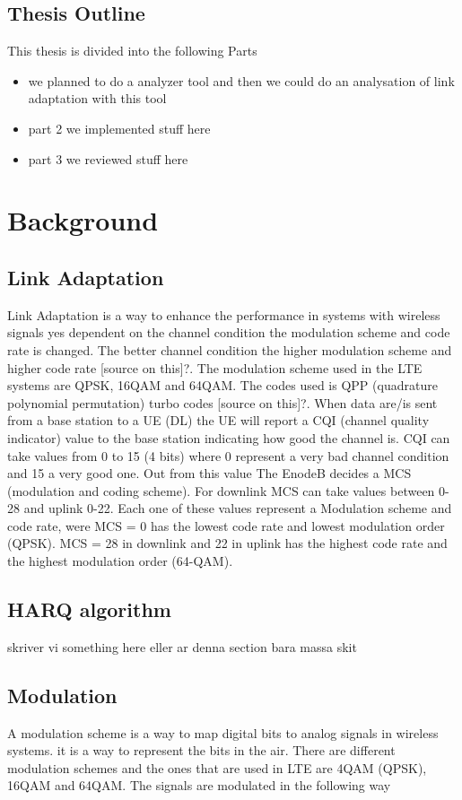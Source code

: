 \documentclass[cropmarks, frame, english]{idamasterthesis}
\begin{document}
\section{Thesis Outline}
This thesis is divided into the following Parts
\begin{itemize}
	\item we planned to do a analyzer tool and then we could do an analysation of link adaptation with this tool
	\item part 2 we implemented stuff here
	\item part 3 we reviewed stuff here
\end{itemize}

\chapter{Background}

\section{Link Adaptation}
Link Adaptation is a way to enhance the performance in systems with wireless signals yes dependent on the channel condition the modulation scheme and code rate is changed. The better channel condition the higher modulation scheme and higher code rate [source on this]?. The modulation scheme used in the LTE systems are QPSK, 16QAM and 64QAM. The codes used is QPP (quadrature polynomial permutation) turbo codes [source on this]?. When data are/is sent from a base station to a UE (DL) the UE will report a CQI (channel quality indicator) value to the base station indicating how good the channel is. CQI can take values from 0 to 15 (4 bits) where 0 represent a very bad channel condition and 15 a very good one. Out from this value The EnodeB decides a MCS (modulation and coding scheme). For downlink MCS can take values between 0-28 and uplink 0-22. Each one of these values represent a Modulation scheme and code rate, were MCS = 0 has the lowest code rate and lowest modulation order (QPSK). MCS = 28 in downlink and 22 in uplink has the highest code rate and the highest modulation order (64-QAM).

\section{HARQ algorithm}
skriver vi something here eller ar denna section bara massa skit

\section{Modulation}
A modulation scheme is a way to map digital bits to analog signals in wireless systems. it is a way to represent the bits in the air.
There are different modulation schemes and the ones that are used in LTE are 4QAM (QPSK), 16QAM and 64QAM. The signals are modulated in the following way 
\end{document}
